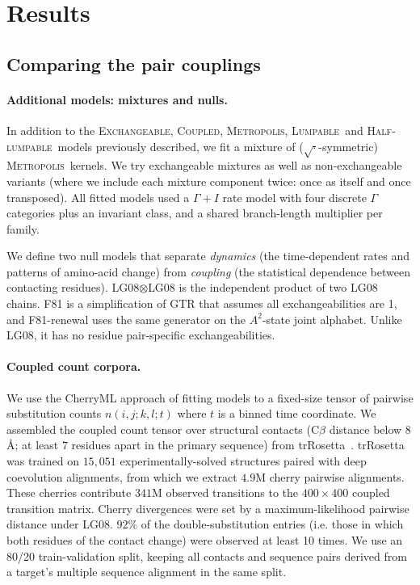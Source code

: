 \documentclass[11pt]{article}
\newcommand{\Coupledm}{\textsc{Coupled}}
\newcommand{\Exchm}{\textsc{Exchangeable}}
\newcommand{\Metrop}{\textsc{Metropolis}}
\newcommand{\Lumpm}{\textsc{Lumpable}}
\newcommand{\Halflump}{\textsc{Half-lumpable}}
\begin{document}
\section{Results}
\label{sec:results}

\subsection{Comparing the pair couplings}
\label{sec:paircompare}
\paragraph{Additional models: mixtures and nulls.} In addition to the \Exchm, \Coupledm, \Metrop, \Lumpm\ and \Halflump\
models previously described, we fit a mixture of ($\sqrt{\cdot}$-symmetric) \Metrop\ kernels. We try
exchangeable mixtures as well as non-exchangeable variants (where we include each mixture component
twice: once as itself and once transposed).
All fitted models used a $\Gamma+I$ rate model with four discrete $\Gamma$ categories plus an invariant class,
and a shared branch-length multiplier per family.

We define two null models that separate \emph{dynamics} (the time-dependent rates and patterns
of amino-acid change) from \emph{coupling} (the statistical dependence between contacting residues).
LG08$\otimes$LG08 is the independent product of two LG08 chains. F81 is a simplification of GTR that assumes all exchangeabilities are 1, and F81-renewal uses the same generator on the $A^2$-state joint alphabet. Unlike LG08, it has no residue pair-specific exchangeabilities.

\paragraph{Coupled count corpora.} We use the CherryML approach of fitting models
to a fixed-size tensor of pairwise substitution counts $n(i,j;k,l;t)$ where $t$ is a binned
time coordinate. We assembled the coupled count tensor
over structural contacts (C$\beta$ distance below $8$ \AA; at least $7$ residues
apart in the primary sequence) from trRosetta~\citep{Yang2020trRosetta}.
trRosetta was trained on $15{,}051$
experimentally-solved structures paired with deep coevolution alignments,
from which we extract $4.9$M cherry pairwise alignments.
These cherries contribute $341$M observed transitions to the $400 \times 400$
coupled transition matrix. Cherry divergences were set by a
maximum-likelihood pairwise distance under LG08.
$92\%$ of the double-substitution entries (i.e. those in which both residues of the
contact change) were observed at least 10 times.
We use an 80/20 train-validation split, keeping all contacts and sequence pairs
derived from a target's multiple sequence alignment in the same split.
\end{document}
